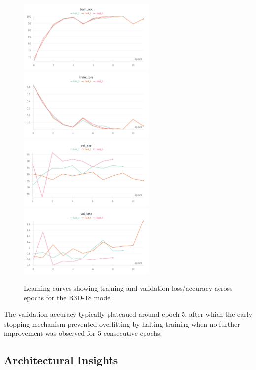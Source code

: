 \documentclass[11pt, a4paper]{article}
\begin{document}
\begin{figure}[htbp]
  \centering
  \includegraphics[width=0.6\textwidth]{figures/3f_train_acc.png}
  \includegraphics[width=0.6\textwidth]{figures/3f_train_loss.png}
  \includegraphics[width=0.6\textwidth]{figures/3f_val_acc.png}
  \includegraphics[width=0.6\textwidth]{figures/3f_val_loss.png}
  \caption{Learning curves showing training and validation loss/accuracy across epochs for the R3D-18 model.}
  \label{fig:learning_curves}
\end{figure}

The validation accuracy typically plateaued around epoch 5, after which the early stopping mechanism prevented overfitting by halting training when no further improvement was observed for 5 consecutive epochs.

\subsection{Architectural Insights}
\end{document}
